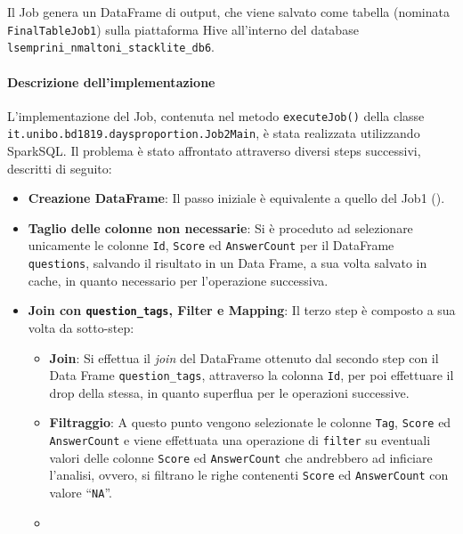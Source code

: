   Il Job genera un DataFrame di output, che viene salvato come tabella (nominata \texttt{FinalTableJob1})
  sulla piattaforma Hive all'interno del database \texttt{lsemprini\_nmaltoni\_stacklite\_db6}.

  \paragraph{Descrizione dell'implementazione}\label{par:job2:spark:implementation}

  L'implementazione del Job, contenuta nel metodo \texttt{executeJob()} %
  della classe \texttt{it.unibo.bd1819.daysproportion.Job2Main}, è stata realizzata utilizzando SparkSQL\@.
  Il problema è stato affrontato attraverso diversi steps successivi, descritti di seguito:

  \begin{itemize}
    \item
      \textbf{Creazione DataFrame}:
      Il passo iniziale è equivalente a quello del Job1 ().
    \item
      \textbf{Taglio delle colonne non necessarie}:
      Si è proceduto ad selezionare unicamente le colonne \texttt{Id},
      \texttt{Score} ed \texttt{AnswerCount} per il DataFrame \texttt{questions}, salvando il risultato in un Data Frame,
      a sua volta salvato in cache, in quanto necessario per l'operazione successiva.
    \item
      \textbf{Join con \texttt{question\_tags}, Filter e Mapping}:
      Il terzo step è composto a sua volta da sotto-step:
      \begin{itemize}
        \item
          \textbf{Join}:
            Si effettua il \textit{join} del DataFrame ottenuto dal secondo step con il Data Frame \texttt{question\_tags}, attraverso
            la colonna \texttt{Id}, per poi effettuare il drop della stessa, in quanto superflua per le operazioni successive.
        \item
          \textbf{Filtraggio}:
          A questo punto vengono selezionate le colonne \texttt{Tag}, \texttt{Score} ed \texttt{AnswerCount}
          e viene effettuata una operazione di \texttt{filter} su eventuali valori delle colonne \texttt{Score} ed \texttt{AnswerCount}
          che andrebbero ad inficiare l'analisi, ovvero, si filtrano le righe contenenti \texttt{Score} ed \texttt{AnswerCount} con valore ``\texttt{NA}''\@.
        \item

\end{itemize}
\end{itemize}
